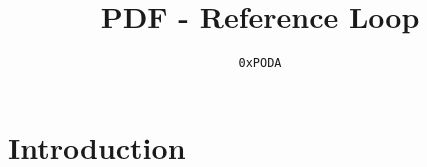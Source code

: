 \documentclass{article}
\title{PDF - Reference Loop}
\author{\texttt{0xPODA}}
\date{}
\begin{document}
\maketitle

\section{Introduction}
\end{document}
